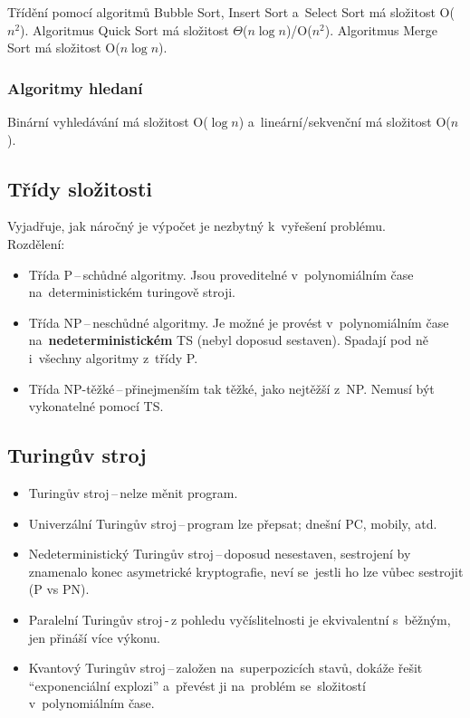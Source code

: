 Třídění pomocí algoritmů Bubble Sort, Insert Sort a~Select Sort má složitost O(\( n^2 \)). Algoritmus Quick Sort má složitost \( \Theta \)(\( n\log{n} \))/O(\( n^2 \)). Algoritmus Merge Sort má složitost O(\( n\log{n} \)).

\subsubsection{Algoritmy hledaní}

Binární vyhledávání má složitost O(\( \log{n} \)) a~lineární/sekvenční má složitost O(\( n \)).

\subsection{Třídy složitosti}

Vyjadřuje, jak náročný je výpočet je nezbytný k~vyřešení problému. \\
Rozdělení:
\begin{itemize}
	\item Třída P\,--\,schůdné algoritmy. Jsou proveditelné v~polynomiálním čase na~deterministickém turingově stroji.
	\item Třída NP\,--\,neschůdné algoritmy. Je možné je provést v~polynomiálním čase na~\textbf{nedeterministickém} TS (nebyl doposud sestaven). Spadají pod ně i~všechny algoritmy z~třídy P.
	\item Třída NP-těžké\,--\,přinejmenším tak těžké, jako nejtěžší z~NP. Nemusí být vykonatelné pomocí TS.
\end{itemize}

\subsection{Turingův stroj}

\begin{itemize}
	\item Turingův stroj\,--\,nelze měnit program.
	\item Univerzální Turingův stroj\,--\,program lze přepsat; dnešní PC, mobily, atd.
	\item Nedeterministický Turingův stroj\,--\,doposud nesestaven, sestrojení by znamenalo konec asymetrické kryptografie, neví se~jestli ho lze vůbec sestrojit (P vs PN).
	\item Paralelní Turingův stroj\,-\,z pohledu vyčíslitelnosti je ekvivalentní s~běžným, jen přináší více výkonu.
	\item Kvantový Turingův stroj\,--\,založen na~superpozicích stavů, dokáže řešit \enquote{exponenciální explozi} a~převést ji na~problém se~složitostí v~polynomiálním čase.
\end{itemize}

